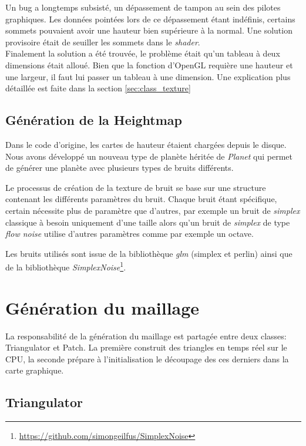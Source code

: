     Un bug a longtemps subsisté, un dépassement de tampon au sein des pilotes graphiques. 
    Les données pointées lors de ce dépassement étant indéfinis, certains sommets pouvaient avoir une hauteur bien supérieure à la normal. Une solution provisoire était de seuiller les sommets dans le \textit{shader}.\\
    Finalement la solution a été trouvée, le problème était qu'un tableau à deux dimensions était alloué.
    Bien que la fonction d'OpenGL requière une hauteur et une largeur, il faut lui passer un tableau à une dimension. Une explication plus détaillée est faite dans la section \ref{sec:class_texture}
    
    \subsection{Génération de la Heightmap}
  
    Dans le code d'origine, les cartes de hauteur étaient chargées depuis le disque. Nous avons développé un nouveau type de planète héritée de \textit{Planet} qui permet de générer une planète avec plusieurs types de bruits différents.
  
    Le processus de création de la texture de bruit se base sur une structure contenant les différents paramètres du bruit.
    Chaque bruit étant spécifique, certain nécessite plus de paramètre que d'autres, par exemple un bruit de \textit{simplex} classique à besoin uniquement d'une taille alors qu'un bruit
    de \textit{simplex} de type \textit{flow noise} utilise d'autres paramètres comme par exemple un octave. 
  
    Les bruits utilisés sont issue de la bibliothèque \textit{glm} (simplex et perlin) ainsi que de la bibliothèque \textit{SimplexNoise}\footnote{\url{https://github.com/simongeilfus/SimplexNoise}}.
    
   \newpage
    
   \section{Génération du maillage}	%
   La responsabilité de la génération du maillage est partagée entre deux classes: Triangulator et Patch. La première construit des triangles en temps réel sur le CPU, la seconde prépare à l'initialisation le découpage des ces derniers dans la carte graphique.
   
  \subsection{Triangulator}
